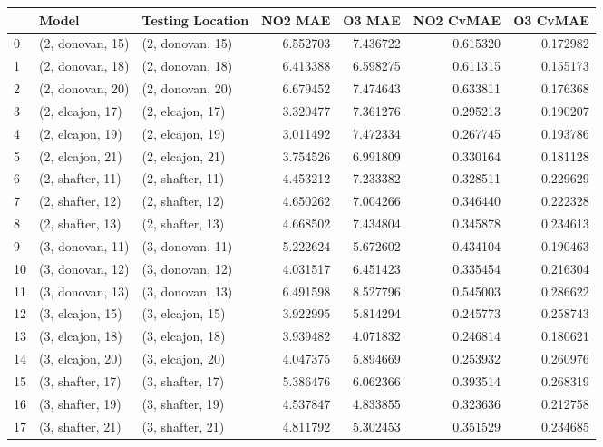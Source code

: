 \begin{tabular}{lllrrrr}
\toprule
{} &             Model &  Testing Location &   NO2 MAE &    O3 MAE &  NO2 CvMAE &  O3 CvMAE \\
\midrule
0  &  (2, donovan, 15) &  (2, donovan, 15) &  6.552703 &  7.436722 &   0.615320 &  0.172982 \\
1  &  (2, donovan, 18) &  (2, donovan, 18) &  6.413388 &  6.598275 &   0.611315 &  0.155173 \\
2  &  (2, donovan, 20) &  (2, donovan, 20) &  6.679452 &  7.474643 &   0.633811 &  0.176368 \\
3  &  (2, elcajon, 17) &  (2, elcajon, 17) &  3.320477 &  7.361276 &   0.295213 &  0.190207 \\
4  &  (2, elcajon, 19) &  (2, elcajon, 19) &  3.011492 &  7.472334 &   0.267745 &  0.193786 \\
5  &  (2, elcajon, 21) &  (2, elcajon, 21) &  3.754526 &  6.991809 &   0.330164 &  0.181128 \\
6  &  (2, shafter, 11) &  (2, shafter, 11) &  4.453212 &  7.233382 &   0.328511 &  0.229629 \\
7  &  (2, shafter, 12) &  (2, shafter, 12) &  4.650262 &  7.004266 &   0.346440 &  0.222328 \\
8  &  (2, shafter, 13) &  (2, shafter, 13) &  4.668502 &  7.434804 &   0.345878 &  0.234613 \\
9  &  (3, donovan, 11) &  (3, donovan, 11) &  5.222624 &  5.672602 &   0.434104 &  0.190463 \\
10 &  (3, donovan, 12) &  (3, donovan, 12) &  4.031517 &  6.451423 &   0.335454 &  0.216304 \\
11 &  (3, donovan, 13) &  (3, donovan, 13) &  6.491598 &  8.527796 &   0.545003 &  0.286622 \\
12 &  (3, elcajon, 15) &  (3, elcajon, 15) &  3.922995 &  5.814294 &   0.245773 &  0.258743 \\
13 &  (3, elcajon, 18) &  (3, elcajon, 18) &  3.939482 &  4.071832 &   0.246814 &  0.180621 \\
14 &  (3, elcajon, 20) &  (3, elcajon, 20) &  4.047375 &  5.894669 &   0.253932 &  0.260976 \\
15 &  (3, shafter, 17) &  (3, shafter, 17) &  5.386476 &  6.062366 &   0.393514 &  0.268319 \\
16 &  (3, shafter, 19) &  (3, shafter, 19) &  4.537847 &  4.833855 &   0.323636 &  0.212758 \\
17 &  (3, shafter, 21) &  (3, shafter, 21) &  4.811792 &  5.302453 &   0.351529 &  0.234685 \\

\end{tabular}
